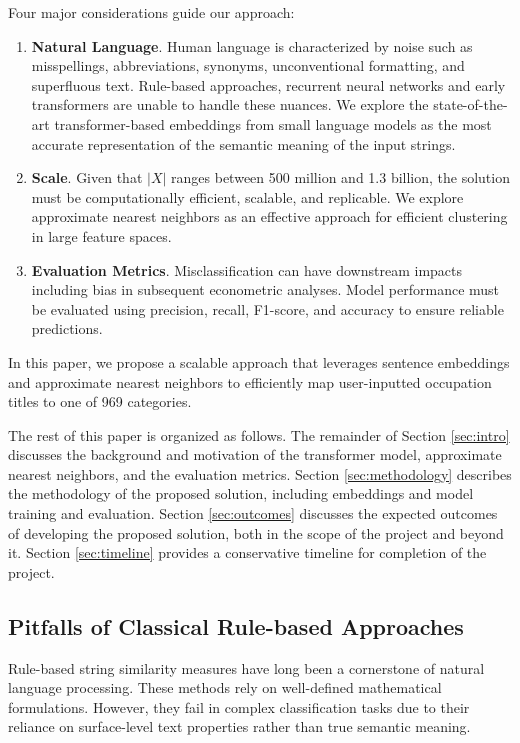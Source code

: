 \documentclass[12pt]{article}
\begin{document}
Four major considerations guide our approach:

\begin{enumerate}

    \item \textbf{Natural Language}. Human language is characterized by noise such as misspellings, abbreviations, synonyms, unconventional formatting, and superfluous text. Rule-based approaches, recurrent neural networks and early transformers are unable to handle these nuances. We explore the state-of-the-art transformer-based embeddings from small language models as the most accurate representation of the semantic meaning of the input strings.
    \item \textbf{Scale}. Given that $|X|$ ranges between 500 million and 1.3 billion, the solution must be computationally efficient, scalable, and replicable. We explore approximate nearest neighbors as an effective approach for efficient clustering in large feature spaces. 
    \item \textbf{Evaluation Metrics}. Misclassification can have downstream impacts including bias in subsequent econometric analyses. Model performance must be evaluated using precision, recall, F1-score, and accuracy to ensure reliable predictions.
    
\end{enumerate}

In this paper, we propose a scalable approach that leverages sentence embeddings and approximate nearest neighbors to efficiently map user-inputted occupation titles to one of 969 categories.

The rest of this paper is organized as follows. The remainder of Section \ref{sec:intro} discusses the background and motivation of the transformer model, approximate nearest neighbors, and the evaluation metrics. Section \ref{sec:methodology} describes the methodology of the proposed solution, including embeddings and model training and evaluation. Section \ref{sec:outcomes} discusses the expected outcomes of developing the proposed solution, both in the scope of the project and beyond it. Section \ref{sec:timeline} provides a conservative timeline for completion of the project.



\subsection{Pitfalls of Classical Rule-based Approaches}

Rule-based string similarity measures have long been a cornerstone of natural language processing. These methods rely on well-defined mathematical formulations. 
However, they fail in complex classification tasks due to their reliance on surface-level text properties rather than true semantic meaning.
\end{document}

